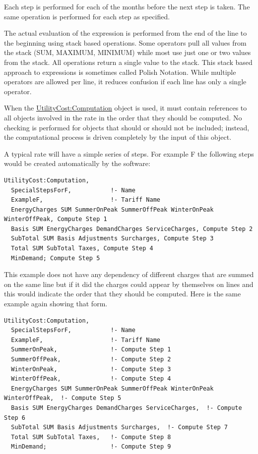 Each step is performed for each of the months before the next step is taken. The same operation is performed for each step as specified.

The actual evaluation of the expression is performed from the end of the line to the beginning using stack based operations. Some operators pull all values from the stack (SUM, MAXIMUM, MINIMUM) while most use just one or two values from the stack. All operations return a single value to the stack. This stack based approach to expressions is sometimes called Polish Notation. While multiple operators are allowed per line, it reduces confusion if each line has only a single operator.

When the \hyperref[utilitycostcomputation]{UtilityCost:Computation} object is used, it must contain references to all objects involved in the rate in the order that they should be computed. No checking is performed for objects that should or should not be included; instead, the computational process is driven completely by the input of this object.

A typical rate will have a simple series of steps. For example F the following steps would be created automatically by the software:

\begin{lstlisting}
UtilityCost:Computation,
  SpecialStepsForF,           !- Name
  ExampleF,                   !- Tariff Name
  EnergyCharges SUM SummerOnPeak SummerOffPeak WinterOnPeak WinterOffPeak, Compute Step 1
  Basis SUM EnergyCharges DemandCharges ServiceCharges, Compute Step 2
  SubTotal SUM Basis Adjustments Surcharges, Compute Step 3
  Total SUM SubTotal Taxes, Compute Step 4
  MinDemand; Compute Step 5
\end{lstlisting}

This example does not have any dependency of different charges that are summed on the same line but if it did the charges could appear by themselves on lines and this would indicate the order that they should be computed. Here is the same example again showing that form.

\begin{lstlisting}
UtilityCost:Computation,
  SpecialStepsForF,           !- Name
  ExampleF,                   !- Tariff Name
  SummerOnPeak,               !- Compute Step 1
  SummerOffPeak,              !- Compute Step 2
  WinterOnPeak,               !- Compute Step 3
  WinterOffPeak,              !- Compute Step 4
  EnergyCharges SUM SummerOnPeak SummerOffPeak WinterOnPeak WinterOffPeak,  !- Compute Step 5
  Basis SUM EnergyCharges DemandCharges ServiceCharges,  !- Compute Step 6
  SubTotal SUM Basis Adjustments Surcharges,  !- Compute Step 7
  Total SUM SubTotal Taxes,   !- Compute Step 8
  MinDemand;                  !- Compute Step 9
\end{lstlisting}

